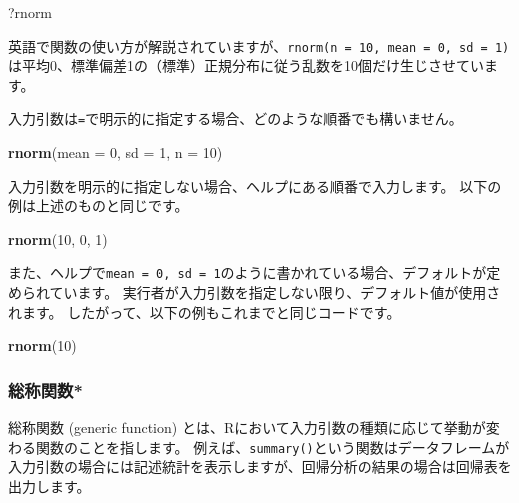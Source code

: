 \documentclass[]{bxjsarticle}
\newenvironment{Shaded}{\begin{snugshade}}{\end{snugshade}}
\newcommand{\DataTypeTok}[1]{\textcolor[rgb]{0.13,0.29,0.53}{#1}}
\newcommand{\DecValTok}[1]{\textcolor[rgb]{0.00,0.00,0.81}{#1}}
\newcommand{\KeywordTok}[1]{\textcolor[rgb]{0.13,0.29,0.53}{\textbf{#1}}}
\newcommand{\NormalTok}[1]{#1}
\begin{document}
\begin{Shaded}
\begin{Highlighting}[]
\NormalTok{?rnorm}
\end{Highlighting}
\end{Shaded}

英語で関数の使い方が解説されていますが、\texttt{rnorm(n\ =\ 10,\ mean\ =\ 0,\ sd\ =\ 1)}は平均0、標準偏差1の（標準）正規分布に従う乱数を10個だけ生じさせています。

入力引数は\texttt{=}で明示的に指定する場合、どのような順番でも構いません。

\begin{Shaded}
\begin{Highlighting}[]
\KeywordTok{rnorm}\NormalTok{(}\DataTypeTok{mean =} \DecValTok{0}\NormalTok{, }\DataTypeTok{sd =} \DecValTok{1}\NormalTok{, }\DataTypeTok{n =} \DecValTok{10}\NormalTok{)}
\end{Highlighting}
\end{Shaded}

入力引数を明示的に指定しない場合、ヘルプにある順番で入力します。
以下の例は上述のものと同じです。

\begin{Shaded}
\begin{Highlighting}[]
\KeywordTok{rnorm}\NormalTok{(}\DecValTok{10}\NormalTok{, }\DecValTok{0}\NormalTok{, }\DecValTok{1}\NormalTok{)}
\end{Highlighting}
\end{Shaded}

また、ヘルプで\texttt{mean\ =\ 0,\ sd\ =\ 1}のように書かれている場合、デフォルトが定められています。
実行者が入力引数を指定しない限り、デフォルト値が使用されます。
したがって、以下の例もこれまでと同じコードです。

\begin{Shaded}
\begin{Highlighting}[]
\KeywordTok{rnorm}\NormalTok{(}\DecValTok{10}\NormalTok{)}
\end{Highlighting}
\end{Shaded}

\hypertarget{ux7dcfux79f0ux95a2ux6570}{%
\subsubsection{総称関数*}\label{ux7dcfux79f0ux95a2ux6570}}

総称関数 (generic function) とは、Rにおいて入力引数の種類に応じて挙動が変わる関数のことを指します。
例えば、\texttt{summary()}という関数はデータフレームが入力引数の場合には記述統計を表示しますが、回帰分析の結果の場合は回帰表を出力します。
\end{document}
